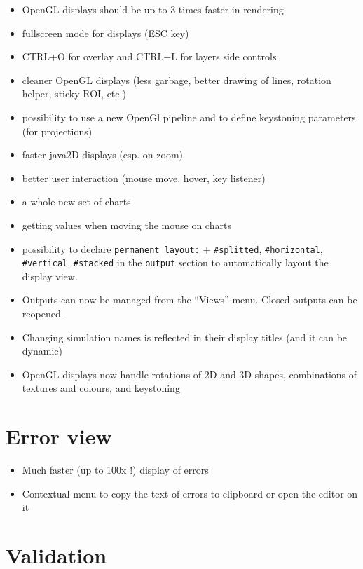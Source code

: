 \documentclass[]{book}
\providecommand{\tightlist}{%
  \setlength{\itemsep}{0pt}\setlength{\parskip}{0pt}}
\theoremstyle{definition}
\theoremstyle{definition}
\theoremstyle{definition}
\theoremstyle{remark}
\begin{document}
\begin{itemize}
\tightlist
\item
  OpenGL displays should be up to 3 times faster in rendering
\item
  fullscreen mode for displays (ESC key)
\item
  CTRL+O for overlay and CTRL+L for layers side controls
\item
  cleaner OpenGL displays (less garbage, better drawing of lines,
  rotation helper, sticky ROI, etc.)
\item
  possibility to use a new OpenGl pipeline and to define keystoning
  parameters (for projections)
\item
  faster java2D displays (esp. on zoom)
\item
  better user interaction (mouse move, hover, key listener)
\item
  a whole new set of charts
\item
  getting values when moving the mouse on charts
\item
  possibility to declare \texttt{permanent\ layout:} +
  \texttt{\#splitted}, \texttt{\#horizontal}, \texttt{\#vertical},
  \texttt{\#stacked} in the \texttt{output} section to automatically
  layout the display view.
\item
  Outputs can now be managed from the ``Views'' menu. Closed outputs can
  be reopened.
\item
  Changing simulation names is reflected in their display titles (and it
  can be dynamic)
\item
  OpenGL displays now handle rotations of 2D and 3D shapes, combinations
  of textures and colours, and keystoning
\end{itemize}

\section{Error view}\label{error-view}

\begin{itemize}
\tightlist
\item
  Much faster (up to 100x !) display of errors
\item
  Contextual menu to copy the text of errors to clipboard or open the
  editor on it
\end{itemize}

\section{Validation}\label{validation}
\end{document}
